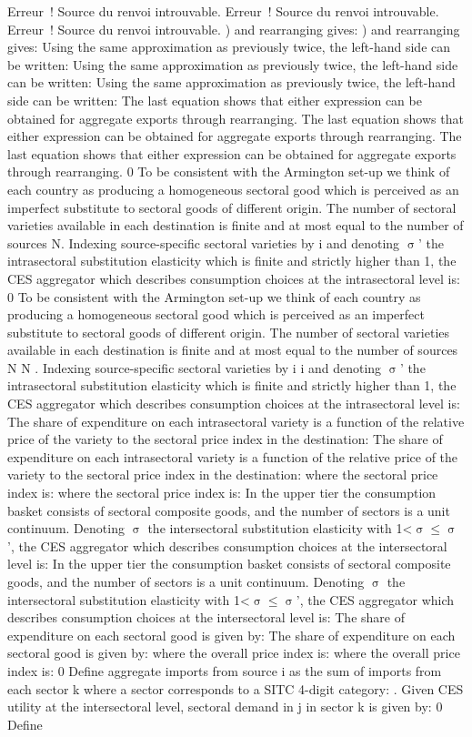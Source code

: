 \documentclass[12pt,twoside,a4paper,notitlepage]{article}
\begin{document}
Erreur~! Source du renvoi introuvable. Erreur~! Source du renvoi introuvable. Erreur~! Source du renvoi introuvable. ) and rearranging gives: ) and rearranging gives: Using the same approximation as previously twice, the left-hand side can be written: Using the same approximation as previously twice, the left-hand side can be written: Using the same approximation as previously twice, the left-hand side can be written: The last equation shows that either expression can be obtained for aggregate exports through rearranging. The last equation shows that either expression can be obtained for aggregate exports through rearranging. The last equation shows that either expression can be obtained for aggregate exports through rearranging. 0 To be consistent with the Armington set-up we think of each country as producing a homogeneous sectoral good which is perceived as an imperfect substitute to sectoral goods of different origin. The number of sectoral varieties available in each destination is finite and at most equal to the number of sources N. Indexing source-specific sectoral varieties by i and denoting ${\upsigma}$' the intrasectoral substitution elasticity which is finite and strictly higher than 1, the CES aggregator which describes consumption choices at the intrasectoral level is: 0 To be consistent with the Armington set-up we think of each country as producing a homogeneous sectoral good which is perceived as an imperfect substitute to sectoral goods of different origin. The number of sectoral varieties available in each destination is finite and at most equal to the number of sources N N . Indexing source-specific sectoral varieties by i i and denoting ${\upsigma}$' the intrasectoral substitution elasticity which is finite and strictly higher than 1, the CES aggregator which describes consumption choices at the intrasectoral level is: The share of expenditure on each intrasectoral variety is a function of the relative price of the variety to the sectoral price index in the destination: The share of expenditure on each intrasectoral variety is a function of the relative price of the variety to the sectoral price index in the destination: where the sectoral price index is: where the sectoral price index is: In the upper tier the consumption basket consists of sectoral composite goods, and the number of sectors is a unit continuum. Denoting ${\upsigma}$ the intersectoral substitution elasticity with 1{\textless}${\upsigma}$${\leq}$${\upsigma}$', the CES aggregator which describes consumption choices at the intersectoral level is: In the upper tier the consumption basket consists of sectoral composite goods, and the number of sectors is a unit continuum. Denoting ${\upsigma}$ the intersectoral substitution elasticity with 1{\textless}${\upsigma}$${\leq}$${\upsigma}$', the CES aggregator which describes consumption choices at the intersectoral level is: The share of expenditure on each sectoral good is given by: The share of expenditure on each sectoral good is given by: where the overall price index is: where the overall price index is: 0 Define aggregate imports from source i as the sum of imports from each sector k where a sector corresponds to a SITC 4-digit category: . Given CES utility at the intersectoral level, sectoral demand in j in sector k is given by: 0 Define 
\end{document}
